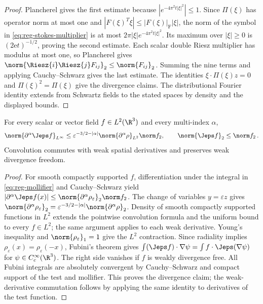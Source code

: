 \documentclass[11pt,reqno]{amsart}
\begin{document}
\begin{proof}
Plancherel gives the first estimate because $|e^{-4\pi^2t|\xi|^2}|\le1$.
Since $\Pi(\xi)$ has operator norm at most one and
$|F(\xi)^T\xi|\le |F(\xi)|_{\mathrm F}|\xi|$, the norm of the symbol in
\eqref{eq:reg-stokes-multiplier} is at most
$2\pi|\xi|e^{-4\pi^2t|\xi|^2}$. Its maximum over $|\xi|\ge0$ is
$(2\mathrm e t)^{-1/2}$, proving the second estimate. Each scalar double
Riesz multiplier has modulus at most one, so Plancherel gives
$\norm{\Riesz{i}\Riesz{j}F_{ij}}_2\le\norm{F_{ij}}_2$. Summing the nine
terms and applying Cauchy--Schwarz gives the last estimate. The identities
$\xi\cdot\Pi(\xi)z=0$ and $\Pi(\xi)^2=\Pi(\xi)$ give the divergence
claims. The distributional Fourier identity extends from Schwartz fields
to the stated spaces by density and the displayed bounds.
\end{proof}

\begin{lemma}\label{lem:reg-mollifier-bounds}
For every scalar or vector field $f\in L^2(\R^3)$ and every multi-index
$\alpha$,
\begin{equation}\label{eq:reg-mollifier-bounds}
  \norm{\partial^\alpha\Jeps f}_{L^\infty}
  \le \varepsilon^{-3/2-|\alpha|}\norm{\partial^\alpha\rho}_{L^2}\norm f_2,
  \qquad \norm{\Jeps f}_2\le\norm f_2\,.
\end{equation}
Convolution commutes with weak spatial derivatives and preserves weak
divergence freedom.
\end{lemma}

\begin{proof}
For smooth compactly supported $f$, differentiation under the integral in
\eqref{eq:reg-mollifier} and Cauchy--Schwarz yield
$|\partial^\alpha\Jeps f(x)|\le\norm{\partial^\alpha\rho_\varepsilon}_2\norm f_2$.
The change of variables $y=\varepsilon z$ gives
$\norm{\partial^\alpha\rho_\varepsilon}_2
=\varepsilon^{-3/2-|\alpha|}\norm{\partial^\alpha\rho}_2$. Density of
smooth compactly supported functions in $L^2$ extends the pointwise
convolution formula and the uniform bound to every $f\in L^2$; the same
argument applies to each weak derivative. Young's inequality and
$\norm{\rho_\varepsilon}_1=1$ give the $L^2$ contraction. Since radiality
implies $\rho_\varepsilon(x)=\rho_\varepsilon(-x)$, Fubini's theorem gives
$\int (\Jeps f)\cdot\nabla\psi=\int f\cdot\Jeps(\nabla\psi)$ for
$\psi\in C_c^\infty(\R^3)$. The right side vanishes if $f$ is weakly
divergence free. All Fubini integrals are absolutely convergent by
Cauchy--Schwarz and compact support of the test and mollifier. This proves
the divergence claim; the weak-derivative commutation follows by applying
the same identity to derivatives of the test function.
\end{proof}
\end{document}
